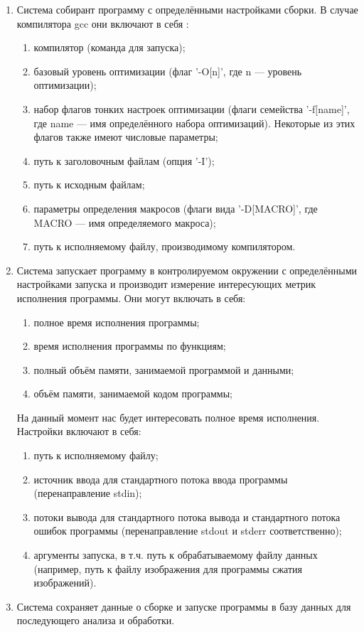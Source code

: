 \begin{enumerate}
	\item Система собирант программу с определёнными настройками сборки. В случае компилятора gcc они включают в себя \cite{gcc-options}:

	\begin{enumerate}
		\item компилятор (команда для запуска);
		\item базовый уровень оптимизации (флаг '-O[n]', где n --- уровень оптимизации);
		\item набор флагов тонких настроек оптимизации (флаги семейства '-f[name]', где name --- имя определённого набора оптимизаций). Некоторые из этих флагов также имеют числовые параметры;
		\item путь к заголовочным файлам (опция '-I');
		\item путь к исходным файлам;
		\item параметры определения макросов (флаги вида '-D[MACRO]', где MACRO --- имя определяемого макроса);
		\item путь к исполняемому файлу, производимому компилятором.
	\end{enumerate}

	\item Система запускает программу в контролируемом окружении с определёнными настройками запуска и производит измерение интересующих метрик исполнения программы. Они могут включать в себя:

	\begin{enumerate}
		\item полное время исполнения программы;
		\item время исполнения программы по функциям;
		\item полный объём памяти, занимаемой программой и данными;
		\item объём памяти, занимаемой кодом программы;
	\end{enumerate}

	На данный момент нас будет интересовать полное время исполнения.
	Настройки включают в себя:

	\begin{enumerate}
		\item путь к исполняемому файлу;
		\item источник ввода для стандартного потока ввода программы (перенаправление stdin);
		\item потоки вывода для стандартного потока вывода и стандартного потока ошибок программы (перенаправление stdout и stderr соответственно);
		\item аргументы запуска, в т.ч. путь к обрабатываемому файлу данных (например, путь к файлу изображения для программы сжатия изображений).

	\end{enumerate}

	\item Система сохраняет данные о сборке и запуске программы в базу данных для последующего анализа и обработки.
\end{enumerate}


